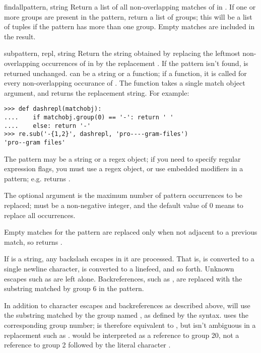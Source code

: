 \begin{funcdesc}{findall}{pattern, string}
Return a list of all non-overlapping matches of  in
.  If one or more groups are present in the pattern,
return a list of groups; this will be a list of tuples if the pattern
has more than one group.  Empty matches are included in the result.
\end{funcdesc}

\begin{funcdesc}{sub}{pattern, repl, string}
Return the string obtained by replacing the leftmost non-overlapping
occurrences of  in  by the replacement
.  If the pattern isn't found,  is returned
unchanged.   can be a string or a function; if a function,
it is called for every non-overlapping occurance of .
The function takes a single match object argument, and returns the
replacement string.  For example:
%
\begin{verbatim}
>>> def dashrepl(matchobj):
....    if matchobj.group(0) == '-': return ' '
....    else: return '-'
>>> re.sub('-{1,2}', dashrepl, 'pro----gram-files')
'pro--gram files'
\end{verbatim}
%
The pattern may be a string or a 
regex object; if you need to specify
regular expression flags, you must use a regex object, or use
embedded modifiers in a pattern; e.g.
 returns .

The optional argument  is the maximum number of pattern
occurrences to be replaced;  must be a non-negative integer, and
the default value of 0 means to replace all occurrences.

Empty matches for the pattern are replaced only when not adjacent to a
previous match, so  returns .

If  is a string, any backslash escapes in it are processed.
That is,  is converted to a single newline character,
 is converted to a linefeed, and so forth.  Unknown escapes
such as  are left alone.  Backreferences, such as , are
replaced with the substring matched by group 6 in the pattern. 

In addition to character escapes and backreferences as described
above,  will use the substring matched by the group
named , as defined by the  syntax.
 uses the corresponding group number;  is therefore equivalent to , but isn't ambiguous in a
replacement such as .   would be
interpreted as a reference to group 20, not a reference to group 2
followed by the literal character .  
\end{funcdesc}

